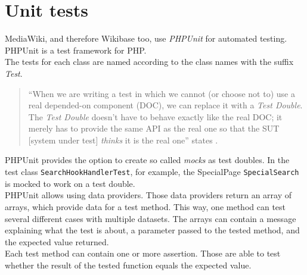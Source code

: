 \section{Unit tests}

MediaWiki, and therefore Wikibase too, use \textit{PHPUnit} for automated testing. PHPUnit is a test framework for PHP. \\
The tests for each class are named according to the class names with the suffix \textit{Test}. \\
\begin{quote}
 ``When we are writing a test in which we cannot (or choose not to) use a real depended-on component (DOC), we can replace it with a \textit{Test Double}. The \textit{Test Double} doesn't have to behave exactly like the real DOC; it merely has to provide the same API as the real one so that the SUT [system under test] \textit{thinks} it is the real one'' states \citet{testing}. 
\end{quote}
PHPUnit provides the option to create so called \textit{mocks} as test doubles. In the test class \texttt{SearchHookHandlerTest}, for example, the SpecialPage \texttt{SpecialSearch} is mocked to work on a test double. \\
PHPUnit allows using data providers. Those data providers return an array of arrays, which provide data for a test method. This way, one method can test several different cases with multiple datasets. The arrays can contain a message explaining what the test is about, a parameter passed to the tested method, and the expected value returned. \\
Each test method can contain one or more assertion. Those are able to test whether the result of the tested function equals the expected value. 

